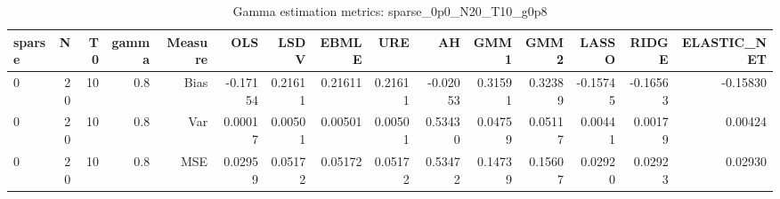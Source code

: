 \begin{table}[!htbp]\centering
\caption{Gamma estimation metrics: sparse_0p0_N20_T10_g0p8}
\label{tab:table1_sparse_0p0_N20_T10_g0p8}
\begin{tabular}{lrrrrrrrrrrrrrr}
\hline
sparse & N & T0 & gamma & Measure & OLS & LSDV & EBMLE & URE & AH & GMM1 & GMM2 & LASSO & RIDGE & ELASTIC_NET \\
\hline
0 & 20 & 10 & 0.8 & Bias & -0.17154 & 0.21611 & 0.21611 & 0.21611 & -0.02053 & 0.31591 & 0.32389 & -0.15745 & -0.16563 & -0.15830 \\
0 & 20 & 10 & 0.8 & Var & 0.00017 & 0.00501 & 0.00501 & 0.00501 & 0.53430 & 0.04759 & 0.05117 & 0.00441 & 0.00179 & 0.00424 \\
0 & 20 & 10 & 0.8 & MSE & 0.02959 & 0.05172 & 0.05172 & 0.05172 & 0.53472 & 0.14739 & 0.15607 & 0.02920 & 0.02923 & 0.02930 \\
\hline
\end{tabular}
\end{table}

